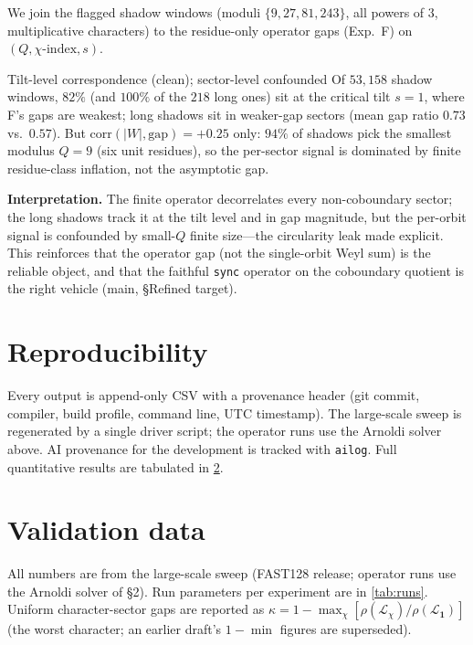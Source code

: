 \documentclass[11pt]{article}
\newcommand{\Lcal}{\mathcal{L}}
\theoremstyle{remark}
\begin{document}
We join the flagged shadow windows (moduli $\{9,27,81,243\}$, all powers of $3$,
multiplicative characters) to the residue-only operator gaps (Exp.~F) on
$(Q,\chi\text{-index},s)$.

\begin{findingbox}{Tilt-level correspondence (clean); sector-level confounded}
Of $53{,}158$ shadow windows, $82\%$ (and $100\%$ of the $218$ long ones) sit at
the critical tilt $s=1$, where F's gaps are weakest; long shadows sit in
weaker-gap sectors (mean gap ratio $0.73$ vs.\ $0.57$). But
$\mathrm{corr}(|W|,\text{gap})=+0.25$ only: $94\%$ of shadows pick the smallest
modulus $Q=9$ (six unit residues), so the per-sector signal is dominated by
finite residue-class inflation, not the asymptotic gap.
\end{findingbox}

\noindent\textbf{Interpretation.} The finite operator decorrelates every
non-coboundary sector; the long shadows track it at the tilt level and in gap
magnitude, but the per-orbit signal is confounded by small-$Q$ finite size---the
circularity leak made explicit. This reinforces that the operator gap (not the
single-orbit Weyl sum) is the reliable object, and that the faithful \texttt{sync}
operator on the coboundary quotient is the right vehicle (main, \S Refined target).

\section{Reproducibility}

Every output is append-only CSV with a provenance header (git commit, compiler,
build profile, command line, UTC timestamp). The large-scale sweep is regenerated
by a single driver script; the operator runs use the Arnoldi solver above. AI
provenance for the development is tracked with \texttt{ailog}. Full quantitative
results are tabulated in \cref{app:data}.

\appendix
\section{Validation data}
\label{app:data}

All numbers are from the large-scale sweep (\textsf{FAST128} release; operator
runs use the Arnoldi solver of \S2). Run parameters per experiment are in
\cref{tab:runs}. Uniform character-sector gaps are reported as
$\kappa=1-\max_\chi[\rho(\Lcal_\chi)/\rho(\Lcal_{\mathbf1})]$ (the worst
character; an earlier draft's $1-\min$ figures are superseded).
\end{document}
